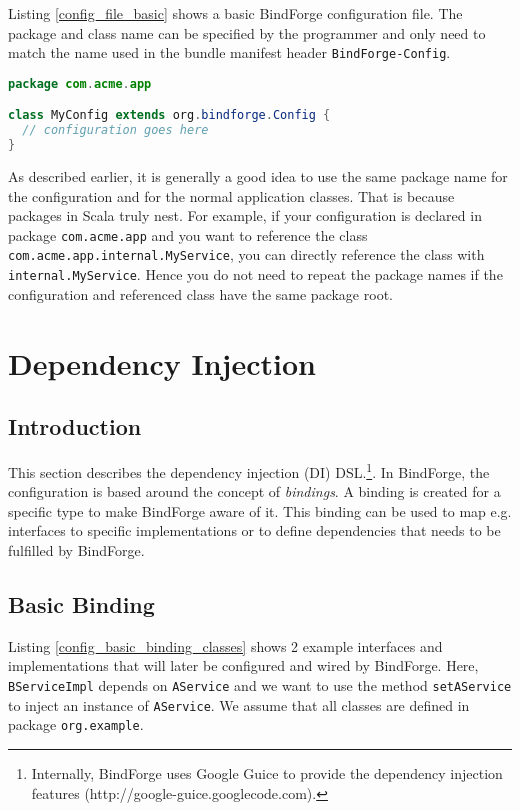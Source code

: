 Listing \ref{config_file_basic} shows a basic BindForge configuration file. The package and class name can be specified by the programmer and only need to match the name used in the bundle manifest header \verb!BindForge-Config!.

\begin{lstlisting}[caption={BindForge configuration file},label=config_file_basic,language=Java]
package com.acme.app

class MyConfig extends org.bindforge.Config {
  // configuration goes here
}
\end{lstlisting}

As described earlier, it is generally a good idea to use the same package name for the configuration and for the normal application classes. That is because packages in Scala truly nest. For example, if your configuration is declared in package \verb!com.acme.app! and you want to reference the class \verb!com.acme.app.internal.MyService!, you can directly reference the class with \verb!internal.MyService!. Hence you do not need to repeat the package names if the configuration and referenced class have the same package root.

\section{Dependency Injection}

\subsection{Introduction}

This section describes the dependency injection (DI) DSL.\footnote{Internally, BindForge uses Google Guice to provide the dependency injection features (http://google-guice.googlecode.com).}. In BindForge, the configuration is based around the concept of \textit{bindings}. A binding is created for a specific type to make BindForge aware of it. This binding can be used to map e.g. interfaces to specific implementations or to define dependencies that needs to be fulfilled by BindForge.

\subsection{Basic Binding}

Listing \ref{config_basic_binding_classes} shows 2 example interfaces and implementations that will later be configured and wired by BindForge. Here, \verb!BServiceImpl! depends on \verb!AService! and we want to use the method \verb!setAService! to inject an instance of \verb!AService!. We assume that all classes are defined in package \verb!org.example!.

